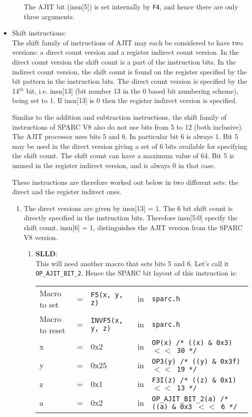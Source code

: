 \begin{itemize}
\begin{enumerate}
    The AJIT bit  (insn[5]) is set internally by  \texttt{F4}, and hence
    there are only three arguments.

  \end{enumerate}
% 
\item {Shift instructions:} \\

  The shift  family of instructions  of AJIT  may each be  considered to
  have  two versions:  a direct  count version  and a  register indirect
  count version.  In the direct count  version the shift count is a part
  of the  instruction bits.   In the indirect  count version,  the shift
  count is  found on the  register specified by  the bit pattern  in the
  instruction  bits.   The direct  count  version  is specified  by  the
  14$^{th}$  bit, i.e.  insn[13]  (bit  number 13  in  the  0 based  bit
  numbering scheme), being set to 1.  If insn[13] is 0 then the register
  indirect version is specified.

  Similar to the addition and subtraction instructions, the shift family
  of instructions of  SPARC V8 also do  not use bits from 5  to 12 (both
  inclusive).  The AJIT processor uses bits  5 and 6.  In particular bit
  6 is always 1.   Bit 5 may be used in the direct  version giving a set
  of 6 bits  available for specifying the shift count.   The shift count
  can have  a maximum  value of  64.  Bit  5 is  unused in  the register
  indirect version, and is always 0 in that case.

  These instructions  are therefore  worked out  below in  two different
  sets: the direct and the register indirect ones.
  \begin{enumerate}
  \item The direct versions  are given by insn[13] = 1.  The 6 bit shift
    count  is directly  specified  in the  instruction bits.   Therefore
    insn[5:0] specify the  shift count.  insn[6] =  1, distinguishes the
    AJIT version from the SPARC V8 version.
    \begin{enumerate}
    \item \textbf{SLLD}:\\
      This will need another macro that sets bits 5 and 6. Let's call it
      \texttt{OP\_AJIT\_BIT\_2}.   Hence the  SPARC bit  layout of  this
      instruction is:

      \begin{tabular}[h]{lclcl}
        Macro to set  &=& \texttt{F5(x, y, z)} &in& \texttt{sparc.h}     \\
        Macro to reset  &=& \texttt{INVF5(x, y, z)} &in& \texttt{sparc.h}     \\
        x &=& 0x2      &in& \texttt{OP(x)  /* ((x) \& 0x3)  $<<$ 30 */} \\
        y &=& 0x25     &in& \texttt{OP3(y) /* ((y) \& 0x3f) $<<$ 19 */} \\
        z &=& 0x1      &in& \texttt{F3I(z) /* ((z) \& 0x1)  $<<$ 13 */} \\
        a &=& 0x2      &in& \texttt{OP\_AJIT\_BIT\_2(a) /* ((a) \& 0x3  $<<$ 6 */}
      \end{tabular}


\end{enumerate}
\end{enumerate}
\end{itemize}
